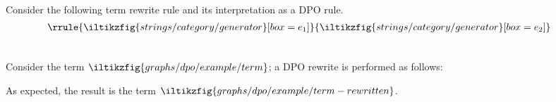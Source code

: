\begin{center}
\end{center}

\begin{example}
    Consider the following term rewrite rule and its interpretation as a DPO
    rule. \[
        \raisebox{2em}{\(\rrule{
                \iltikzfig{strings/category/generator}[box=e_1]
            }{
                \iltikzfig{strings/category/generator}[box=e_2]
            }\)}
        \qquad
        
    \]
    Consider the term \(
    \iltikzfig{graphs/dpo/example/term}
    \); a DPO rewrite is performed as follows:
    \begin{center}
        
    \end{center}
    As expected, the result is the term \(
    \iltikzfig{graphs/dpo/example/term-rewritten}
    \).
\end{example}